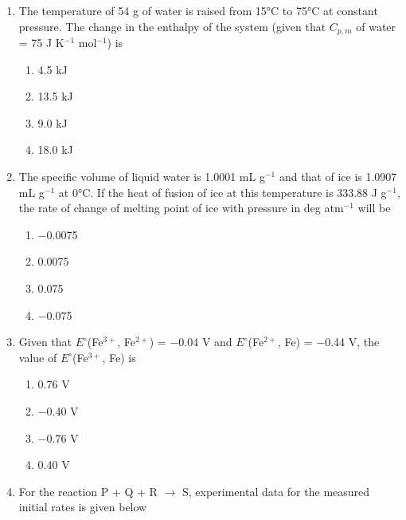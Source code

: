 \documentclass[journal,12pt,onecolumn]{IEEEtran}
\theoremstyle{remark}
\begin{document}
\begin{enumerate}
\item  The temperature of 54 g of water is raised from 15°C to 75°C at constant pressure. The change in the enthalpy of the system (given that $C_{p,m}$ of water = 75 J K$^{-1}$ mol$^{-1}$) is \hfill{}

\begin{multicols}{2}
\begin{enumerate}
 \item   4.5 kJ
 \item   13.5 kJ
 \item   9.0 kJ
 \item   18.0 kJ
\end{enumerate}
\end{multicols}
  

\item  The specific volume of liquid water is 1.0001 mL g$^{-1}$ and that of ice is 1.0907 mL g$^{-1}$ at 0°C. If the heat of fusion of ice at this temperature is 333.88 J g$^{-1}$, the rate of change of melting point of ice with pressure in deg atm$^{-1}$ will be \hfill{}

\begin{multicols}{2}
\begin{enumerate}
 \item   $-$0.0075
 \item   0.0075
 \item   0.075
 \item   $-$0.075
\end{enumerate}
\end{multicols}
  

\item  Given that $E^\circ$(Fe$^{3+}$, Fe$^{2+}$) = $-$0.04 V and $E^\circ$(Fe$^{2+}$, Fe) = $-$0.44 V, the value of $E^\circ$(Fe$^{3+}$, Fe) is \hfill{}

\begin{multicols}{2}
\begin{enumerate}
 \item   0.76 V
 \item   $-$0.40 V
 \item   $-$0.76 V
 \item   0.40 V
\end{enumerate}
\end{multicols}
  

\item  For the reaction P + Q + R $\rightarrow$ S, experimental data for the measured initial rates is given below \hfill{}


\end{enumerate}
\end{document}
